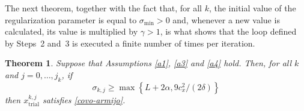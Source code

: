 \documentclass[11pt]{article}
\newcommand{\xkjtrial}{x^{k,j}_{\mathrm{trial}}}
\newtheorem{theorem}{Theorem}[section]
\begin{document}
The next theorem, together with the fact that, for all $k$, the initial value of the regularization parameter is equal to $\sigma_{\min} > 0$ and, whenever a new value is calculated, its value is multiplied by $\gamma>1$, is what shows that the loop defined by Steps~2 and~3 is executed a finite number of times per iteration. 

\begin{theorem} \label{teo5}
Suppose that Assumptions \ref{a1}, \ref{a3} and \ref{a4} hold. Then, for all $k$ and $j=0,\dots,j_k$, if 
\begin{equation}\label{este}
\sigma_{k,j} \geq \max \left\{ L + 2 \alpha, 9 c_x^2 / (2 \delta) \right\}
\end{equation}
then $\xkjtrial$ satisfies \eqref{covo-armijo}.
\end{theorem}
\end{document}
